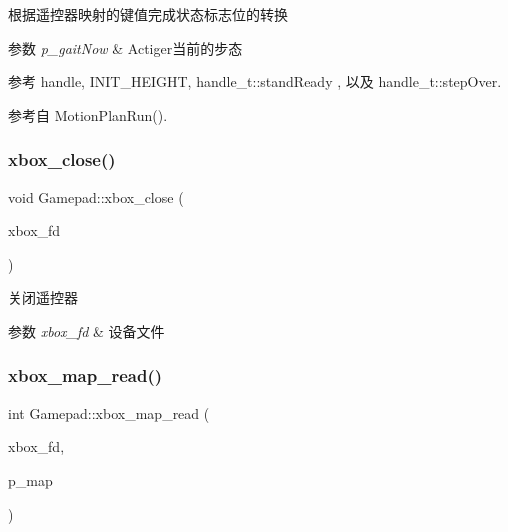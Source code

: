 根据遥控器映射的键值完成状态标志位的转换 


\begin{DoxyParams}{参数}
{\em p\+\_\+gait\+Now} & Actiger当前的步态 \\
\hline
\end{DoxyParams}


参考 handle, I\+N\+I\+T\+\_\+\+H\+E\+I\+G\+HT, handle\+\_\+t\+::stand\+Ready , 以及 handle\+\_\+t\+::step\+Over.



参考自 Motion\+Plan\+Run().

\mbox{\label{classquadruped_1_1Gamepad_aedbe5a93bd4af4b3fb22137ae1549612}} 
\subsubsection{\texorpdfstring{xbox\+\_\+close()}{xbox\_close()}}
{\footnotesize\ttfamily void Gamepad\+::xbox\+\_\+close (\begin{DoxyParamCaption}\item[{int}]{xbox\+\_\+fd }\end{DoxyParamCaption})}



关闭遥控器 


\begin{DoxyParams}{参数}
{\em xbox\+\_\+fd} & 设备文件 \\
\hline
\end{DoxyParams}
\mbox{\label{classquadruped_1_1Gamepad_a0a3c2f9e2e580af60d3d961cd7c961f5}} 
\subsubsection{\texorpdfstring{xbox\+\_\+map\+\_\+read()}{xbox\_map\_read()}}
{\footnotesize\ttfamily int Gamepad\+::xbox\+\_\+map\+\_\+read (\begin{DoxyParamCaption}\item[{int}]{xbox\+\_\+fd,  }\item[{\hyperlink{structxbox__map__t}{xbox\+\_\+map\+\_\+t} $\ast$}]{p\+\_\+map }\end{DoxyParamCaption})}



